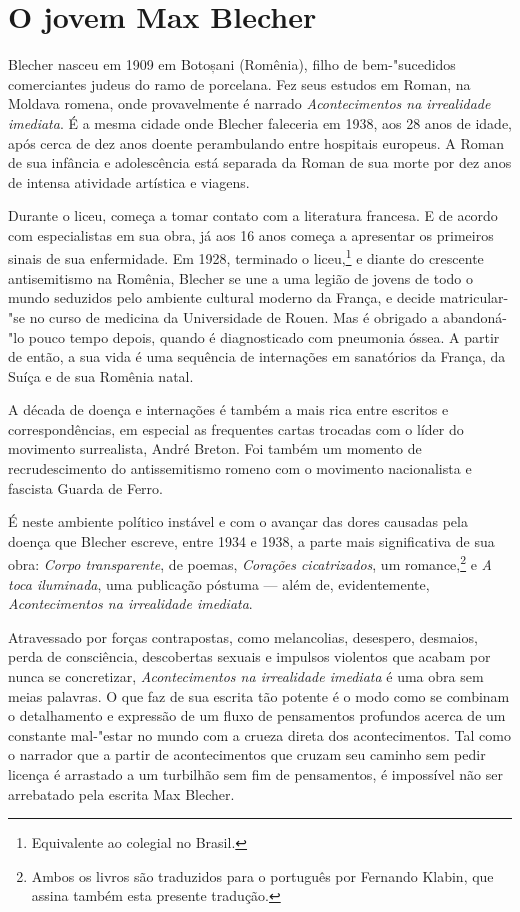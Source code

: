 \section{O jovem Max Blecher}

Blecher nasceu em 1909 em Botoșani (Romênia), filho de bem-"sucedidos comerciantes judeus do ramo de porcelana. Fez seus estudos em Roman, na Moldava romena, onde provavelmente é narrado \textit{Acontecimentos na irrealidade imediata}. É a mesma cidade onde Blecher faleceria em 1938, aos 28 anos de idade, após cerca de dez anos doente perambulando entre hospitais europeus. A Roman de sua infância e adolescência está separada da Roman de sua morte por dez anos de intensa atividade artística e viagens.

Durante o liceu, começa a tomar contato com a literatura francesa. E de acordo com especialistas em sua obra, já aos 16 anos começa a apresentar os primeiros sinais de sua enfermidade. Em 1928, terminado o liceu,\footnote{Equivalente ao colegial no Brasil.} e diante do crescente antisemitismo na Romênia, Blecher se une a uma legião de jovens de todo o mundo seduzidos pelo ambiente cultural moderno da França, e decide matricular-"se no curso de medicina da Universidade de Rouen. Mas é obrigado a abandoná-"lo pouco tempo depois, quando é diagnosticado com pneumonia óssea. A partir de então, a sua vida é uma sequência de internações em sanatórios da França, da Suíça e de sua Romênia natal.
	
A década de doença e internações é também a mais rica entre escritos e correspondências, em especial as frequentes cartas trocadas com o líder do movimento surrealista, André Breton. Foi também um momento de recrudescimento do antissemitismo romeno com o movimento nacionalista e fascista Guarda de Ferro. 

É neste ambiente político instável e com o avançar das dores causadas pela doença que Blecher escreve, entre 1934 e 1938, a parte mais significativa de sua obra: \textit{Corpo transparente}, de poemas, \textit{Corações cicatrizados}, um romance,\footnote{Ambos os livros são traduzidos para o português por Fernando Klabin, que  assina também esta presente tradução.} e \textit{A toca iluminada}, uma publicação póstuma --- além de, evidentemente, \textit{Acontecimentos na irrealidade imediata}.

Atravessado por forças contrapostas, como melancolias, desespero, desmaios, perda de consciência, descobertas sexuais e impulsos violentos que acabam por nunca se concretizar, \textit{Acontecimentos na irrealidade imediata} é uma obra sem meias palavras. O que faz de sua escrita tão potente é o modo como se combinam o detalhamento e expressão de um fluxo de pensamentos profundos acerca de um constante mal-"estar no mundo com a crueza direta dos acontecimentos. Tal como o narrador que a partir de acontecimentos que cruzam seu caminho sem pedir licença é arrastado a um turbilhão sem fim de pensamentos, é impossível não ser arrebatado pela escrita Max Blecher.